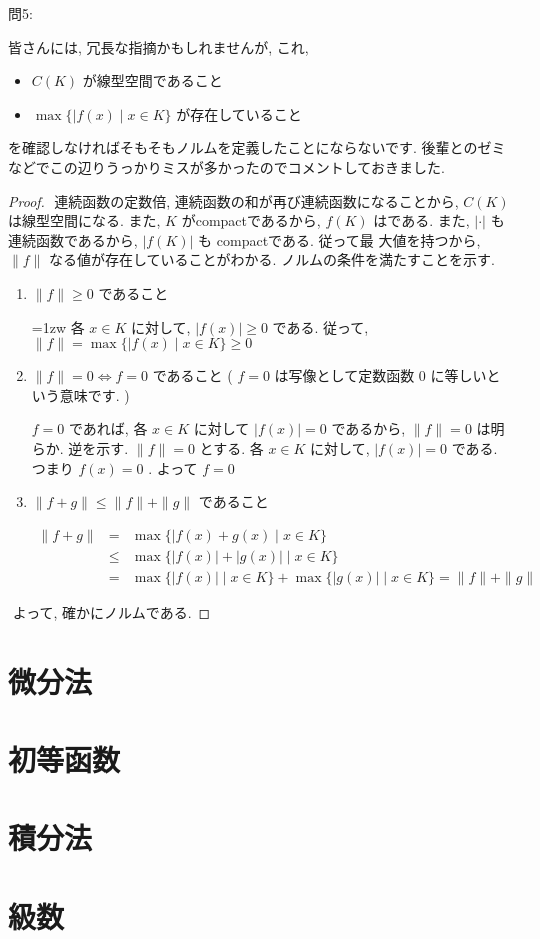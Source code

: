 \documentclass[dvipdfmx,uplatex,11pt]{jsarticle}
\begin{document}
問5:\par 
皆さんには, 冗長な指摘かもしれませんが, これ, 
	\begin{itemize}
		\item $C ( K )$ が線型空間であること
		\item $\max \{ | f ( x ) \mid x \in K \}$ が存在していること
\end{itemize}
を確認しなければそもそもノルムを定義したことにならないです. 後輩とのゼミなどでこの辺りうっかりミスが多かったのでコメントしておきました. 
\dotfill
\begin{leftbar}
	\begin{proof}
​
	連続函数の定数倍, 連続函数の和が再び連続函数になることから, $C ( K )$ は線型空間になる. また, $K$ がcompactであるから, $f ( K )$ はである. また, $| \cdot |$ も連続函数であるから, $| f ( K ) |$ も compactである. 従って最
	大値を持つから, $\| f \|$ なる値が存在していることがわかる. ノルムの条件を満たすことを示す. 
		\begin{enumerate}
			\item $\| f \| \geq 0$ であること
				
				\parindent=1zw 各 $x \in K$ に対して, $| f ( x ) | \geq 0$ である. 従って, $\| f \| = \max \{ | f ( x ) \mid x \in K \} \geq 0$
				
			\item $\| f \| = 0 \Leftrightarrow f = 0$ であること ( $f = 0$ は写像として定数函数 $0$ に等しいという意味です. )	
				
				$f = 0$ であれば, 各 $x \in K$ に対して $| f ( x ) | = 0$ であるから, $\| f \| = 0$ は明らか. 逆を示す. $\| f \| = 0$ とする. 各 $x \in K$ に対して, $| f ( x ) | = 0$ である. つまり $f ( x ) = 0$ . よって $f = 0$
				
			\item $\| f + g \| \leq \| f \| + \| g \|$ であること
			
				\begin{eqnarray*}
					\| f + g \| & = & \max \{ | f ( x ) + g ( x ) \mid x \in K \} \\
					& \leq & \max \{ | f ( x ) | + | g ( x ) | \mid x \in K \} \\
					& = & \max \{ | f ( x ) |  \mid x \in K \} + \max \{ | g ( x ) |  \mid x \in K \} = \| f \| + \| g \|
				\end{eqnarray*}
		\end{enumerate}
​
	よって, 確かにノルムである. 
\end{proof}
\end{leftbar}
\newpage
\section{微分法}

\newpage

\section{初等函数}

\newpage

\section{積分法}

\newpage

\section{級数}
\end{document}

